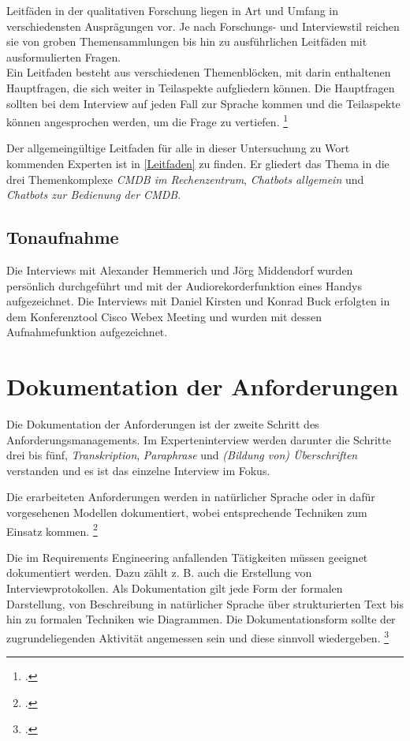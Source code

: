 Leitfäden in der qualitativen Forschung liegen in Art und Umfang in verschiedensten Ausprägungen vor. Je nach Forschungs- und Interviewstil reichen sie von groben Themensammlungen bis hin zu ausführlichen Leitfäden mit ausformulierten Fragen.\\
Ein Leitfaden besteht aus verschiedenen Themenblöcken, mit darin enthaltenen Hauptfragen, die sich weiter in Teilaspekte aufgliedern können. Die Hauptfragen sollten bei dem Interview auf jeden Fall zur Sprache kommen und die Teilaspekte können angesprochen werden, um die Frage zu vertiefen.
\footcite[Vgl.][27\psq]{Bogner_2014_Interview}

Der allgemeingültige Leitfaden für alle in dieser Untersuchung zu Wort kommenden Experten ist in \autoref{Leitfaden} zu finden. Er gliedert das Thema in die drei Themenkomplexe \textit{CMDB im Rechenzentrum}, \textit{Chatbots allgemein} und \textit{Chatbots zur Bedienung der CMDB}.

\subsection{Tonaufnahme}
Die Interviews mit Alexander Hemmerich und Jörg Middendorf wurden persönlich durchgeführt und mit der Audiorekorderfunktion eines Handys aufgezeichnet. Die Interviews mit Daniel Kirsten und Konrad Buck erfolgten in dem Konferenztool Cisco Webex Meeting und wurden mit dessen Aufnahmefunktion aufgezeichnet.




\section{Dokumentation der Anforderungen}
Die Dokumentation der Anforderungen ist der zweite Schritt des Anforderungsmanagements. Im Experteninterview werden darunter die Schritte drei bis fünf, \textit{Transkription}, \textit{Paraphrase} und \textit{(Bildung von) Überschriften} verstanden und es ist das einzelne Interview im Fokus.

Die erarbeiteten Anforderungen werden in natürlicher Sprache oder in dafür vorgesehenen Modellen dokumentiert, wobei entsprechende Techniken zum Einsatz kommen. \footcite[Vgl.][4]{Pohl_2015_Requirements}

Die im Requirements Engineering anfallenden Tätigkeiten müssen geeignet dokumentiert werden. Dazu zählt z. B. auch die Erstellung von Interviewprotokollen. Als Dokumentation gilt jede Form der formalen Darstellung, von Beschreibung in natürlicher Sprache über strukturierten Text bis hin zu formalen Techniken wie Diagrammen. Die Dokumentationsform sollte der zugrundeliegenden Aktivität angemessen sein und diese sinnvoll wiedergeben. \footcite[Vgl.][35\psqq]{Pohl_2015_Requirements}


